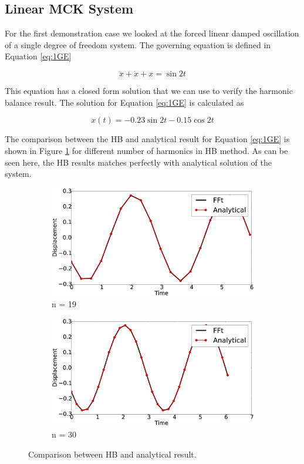 \documentclass[12pt, a4paper]{extarticle}
\begin{document}
\subsection{Linear MCK System}
For the first demonstration case we looked at the forced linear damped oscillation of a single degree of freedom system. The governing equation is defined in Equation \eqref{eq:1GE}

\begin{equation}\label{eq:1GE}
	\ddot{x} + \dot{x} + x = \sin 2t
\end{equation}

This equation has a closed form solution that we can use to verify the harmonic balance result. The solution for Equation \eqref{eq:1GE} is calculated as

\begin{equation}
	x(t) = -0.23 \sin 2t - 0.15 \cos 2t
\end{equation}

The comparison between the HB and analytical result for Equation \eqref{eq:1GE} is shown in Figure \ref{fig:R1} for different number of harmonics in HB method. As can be seen here, the HB results matches perfectly with analytical solution of the system.

\begin{figure}[H]
	\centering
	\begin{subfigure}[h]{8.0 cm}
		\includegraphics[width=8.0 cm]{figure/1N19.eps}
		\caption{n = 19}
	\end{subfigure}
	\begin{subfigure}[h]{8.0 cm}
        \includegraphics[width=8.0 cm]{figure/1N30.eps}
		\caption{n = 30}
    \end{subfigure}
    \caption{Comparison between HB and analytical result.}
    \label{fig:R1}
\end{figure}
\end{document}
